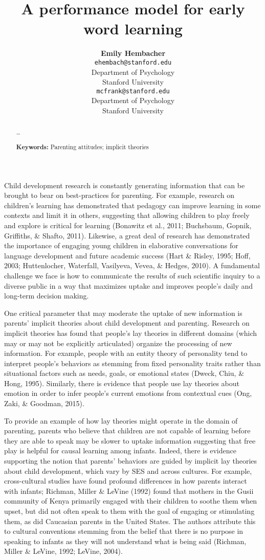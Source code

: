 \documentclass[10pt, letterpaper]{article}
\title{A performance model for early word learning}
\author{{\large \bf Emily Hembacher} \\ \texttt{ehembach@stanford.edu} \\ Department of Psychology \\ Stanford University \And {\large \bf Michael C. Frank} \\ \texttt{mcfrank@stanford.edu} \\ Department of Psychology \\ Stanford University}
\begin{document}
\maketitle

\begin{abstract}
\ldots{}

\textbf{Keywords:}
Parenting attitudes; implicit theories
\end{abstract}

Child development research is constantly generating information that can
be brought to bear on best-practices for parenting. For example,
research on children's learning has demonstrated that pedagogy can
improve learning in some contexts and limit it in others, suggesting
that allowing children to play freely and explore is critical for
learning (Bonawitz et al., 2011; Buchsbaum, Gopnik, Griffiths, \&
Shafto, 2011). Likewise, a great deal of research has demonstrated the
importance of engaging young children in elaborative conversations for
language development and future academic success (Hart \& Risley, 1995;
Hoff, 2003; Huttenlocher, Waterfall, Vasilyeva, Vevea, \& Hedges, 2010).
A fundamental challenge we face is how to communicate the results of
such scientific inquiry to a diverse public in a way that maximizes
uptake and improves people's daily and long-term decision making.

One critical parameter that may moderate the uptake of new information
is parents' implicit theories about child development and parenting.
Research on implicit theories has found that people's lay theories in
different domains (which may or may not be explicitly articulated)
organize the processing of new information. For example, people with an
entity theory of personality tend to interpret people's behaviors as
stemming from fixed personality traits rather than situational factors
such as needs, goals, or emotional states (Dweck, Chiu, \& Hong, 1995).
Similarly, there is evidence that people use lay theories about emotion
in order to infer people's current emotions from contextual cues (Ong,
Zaki, \& Goodman, 2015).

To provide an example of how lay theories might operate in the domain of
parenting, parents who believe that children are not capable of learning
before they are able to speak may be slower to uptake information
suggesting that free play is helpful for causal learning among infants.
Indeed, there is evidence supporting the notion that parents' behaviors
are guided by implicit lay theories about child development, which vary
by SES and across cultures. For example, cross-cultural studies have
found profound differences in how parents interact with infants;
Richman, Miller \& LeVine (1992) found that mothers in the Gusii
community of Kenya primarily engaged with their children to soothe them
when upset, but did not often speak to them with the goal of engaging or
stimulating them, as did Caucasian parents in the United States. The
authors attribute this to cultural conventions stemming from the belief
that there is no purpose in speaking to infants as they will not
understand what is being said (Richman, Miller \& LeVine, 1992; LeVine,
2004).
\end{document}
